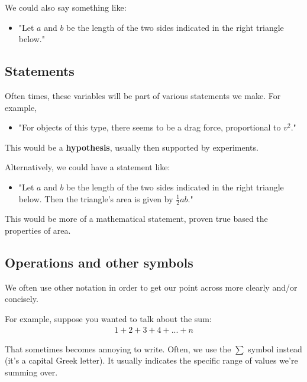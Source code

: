 \documentclass{book}
\begin{document}
We could also say something like:

\begin{itemize}
\item "Let $a$ and $b$ be the length of the two sides indicated in the right triangle below."
\end{itemize}



\subsection{Statements}

Often times, these variables will be part of various statements we make. For example, 
\begin{itemize}
\item "For objects of this type, there seems to be a drag force, proportional to $v^2$." 
\end{itemize}

This would be a \textbf{hypothesis}, usually then supported by experiments. 

Alternatively, we could have a statement like:

\begin{itemize}
\item "Let $a$ and $b$ be the length of the two sides indicated in the right triangle below. Then the triangle's area is given by $\frac{1}{2}ab$."
\end{itemize}

This would be more of a mathematical statement, proven true based the properties of area.


\subsection{Operations and other symbols}

We often use other notation in order to get our point across more clearly and/or concisely. 

For example, suppose you wanted to talk about the sum:
\begin{align*}
1 + 2 + 3 + 4 + ... + n
\end{align*}

That sometimes becomes annoying to write. Often, we use the $\sum$ symbol instead (it's a capital Greek letter). It usually indicates the specific range of values we're summing over. %
\end{document}
